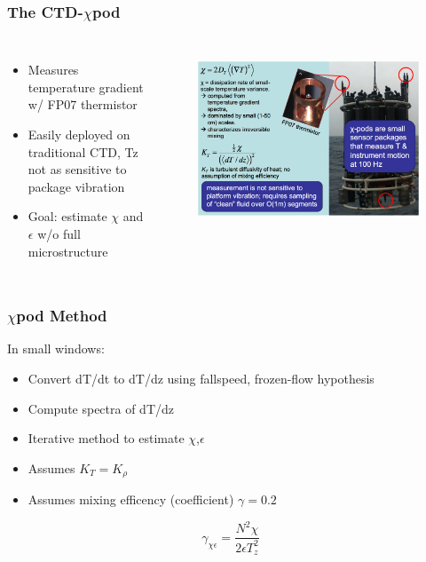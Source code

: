 \documentclass{beamer}
\begin{document}
\begin{frame}
 \frametitle{The CTD-$\chi$pod}

\begin{columns}

   \begin{itemize}
  \item Measures temperature gradient w/ FP07 thermistor
  \item Easily deployed on traditional CTD, Tz not as sensitive to package vibration
  \item Goal: estimate $\chi$ and $\epsilon$ w/o full microstructure
  \end{itemize}


\begin{figure}[htbp]
\begin{center}
\includegraphics[scale=0.35]{chipod_slide.png}
\label{default}
\end{center}
\end{figure}

\end{columns}

\end{frame}


\begin{frame}
 \frametitle{$\chi$pod Method}

In small windows:
   \begin{itemize}
  \item Convert dT/dt to dT/dz using fallspeed, frozen-flow hypothesis
  \item  Compute spectra of dT/dz
  \item Iterative method to estimate $\chi$,$\epsilon$
  \item Assumes $K_T=K_{\rho}$
  \item Assumes mixing efficency (coefficient) $\gamma=0.2$
  \end{itemize}

\begin{equation}
\gamma_{\chi\epsilon}=\frac{N^2 \chi}{2\epsilon T_{z}^{2}} 
\end{equation}

\end{frame}
\end{document}
